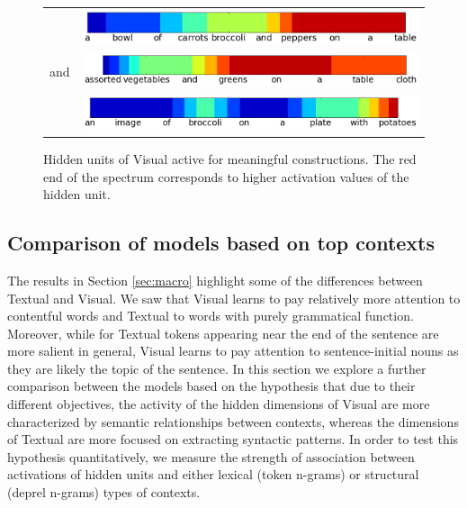 \begin{figure}
\begin{tabular}{l|r}
\hline
\multirow{5}{*}{\begin{sideways}\sf and\end{sideways}} & 
\includegraphics[scale=0.25]{dimensions/broccoliandpeppers}    \\
& \includegraphics[scale=0.25]{dimensions/andgreensvis}  \\
& \includegraphics[scale=0.25]{dimensions/broccolipotatoes}      \\


\end{tabular}

\caption{Hidden units of {\sc Visual} active for meaningful constructions.
The red end of the spectrum corresponds to higher activation values of the hidden unit.}
\label{fig:dimheat}
\end{figure}

\subsection{Comparison of models based on top contexts}
\label{seq:describe}

The results in Section \ref{sec:macro} highlight some of the
differences between {\sc Textual} and {\sc Visual}. We saw that {\sc Visual}
learns to pay relatively more attention to contentful words
and {\sc Textual} to words with purely grammatical function. Moreover,
while for {\sc Textual} tokens appearing near the end of the sentence
are more salient in general, {\sc Visual} learns to pay attention to
sentence-initial nouns as they are likely the {\sc topic} of the
sentence. In this section we explore a further comparison between the
models based on the hypothesis that due to their different objectives,
the activity of the hidden dimensions of {\sc Visual} are more
characterized by semantic relationships between contexts, whereas the
dimensions of {\sc Textual} are more focused on extracting syntactic
patterns. In order to test this hypothesis quantitatively, we measure the strength
of association between activations of hidden units and either lexical
(token n-grams) or structural (deprel n-grams) types of contexts.


